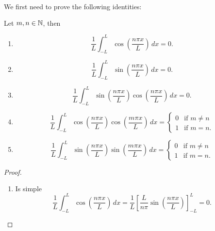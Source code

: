 \documentclass[10pt, a4paper]{article}
\begin{document}
We first need to prove the following identities:
\begin{lemma}
    Let $m, n \in \mathbb{N}$,
    then
    \begin{enumerate}[label = \roman*)]
        \item
        \[
        \frac{1}{L}\int_{-L}^{L}\cos\left(\frac{n\pi x}{L}\right)\,dx = 0.
        \]
        \item
        \[
        \frac{1}{L}\int_{-L}^{L}\sin\left(\frac{n\pi x}{L}\right)\,dx = 0.
        \]
        \item
        \[
        \frac{1}{L}\int_{-L}^{L}\sin\left(\frac{n\pi x}{L}\right)\cos\left(\frac{n\pi x}{L}\right)\,dx = 0.
        \]
        \item
        \[
        \frac{1}{L}\int_{-L}^{L}\cos\left(\frac{n\pi x}{L}\right)\cos\left(\frac{m\pi x}{L}\right)\,dx = \begin{cases}
            0 & \text{if } m \neq n \\
            1 & \text{if } m = n.
        \end{cases}
        \]
        \item
        \[
        \frac{1}{L}\int_{-L}^{L}\sin\left(\frac{n\pi x}{L}\right)\sin\left(\frac{m\pi x}{L}\right)\,dx = \begin{cases}
            0 & \text{if } m \neq n \\
            1 & \text{if } m = n.
        \end{cases}
        \]
    \end{enumerate}
    \begin{proof}\phantom{}
        \begin{enumerate}[label = \roman*)]
            \item Is simple
            \[
            \frac{1}{L}\int_{-L}^{L}\cos\left(\frac{n\pi x}{L}\right)\,dx = \frac{1}{L}\left[\frac{L}{n\pi}\sin\left(\frac{n\pi x}{L}\right)\right]_{-L}^{L} = 0.
\]
\end{enumerate}
\end{proof}
\end{lemma}
\end{document}
